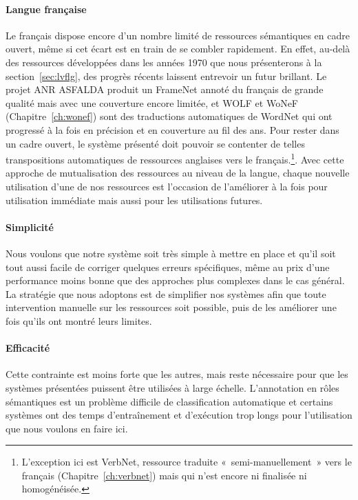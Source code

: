 \paragraph{Langue française} Le français dispose encore d'un nombre limité de
ressources sémantiques en cadre ouvert, même si cet écart est en train de se
combler rapidement. En effet, au-delà des ressources développées dans les
années 1970 que nous présenterons à la section~\ref{sec:lvflg}, des progrès
récents laissent entrevoir un futur brillant. Le projet ANR ASFALDA
\citep{candito2014developing} produit un FrameNet annoté du français de grande
qualité mais avec une couverture encore limitée, et WOLF
\citep{sagot2008building} et WoNeF (Chapitre~\ref{ch:wonef})  sont des
traductions automatiques de WordNet \citep{fellbaum1998wordnet} qui ont
progressé à la fois en précision et en couverture au fil des ans. Pour rester
dans un cadre ouvert, le système présenté doit pouvoir se contenter de telles
transpositions automatiques de ressources anglaises vers le
français.\footnote{L'exception ici est VerbNet, ressource traduite
«~semi-manuellement~» vers le français (Chapitre~\ref{ch:verbnet}) mais qui
n'est encore ni finalisée ni homogénéisée.}. Avec cette approche de
mutualisation des ressources au niveau de la langue, chaque nouvelle
utilisation d'une de nos ressources est l'occasion de l'améliorer à la fois
pour utilisation immédiate mais aussi pour les utilisations futures.

\paragraph{Simplicité} Nous voulons que notre système soit très simple à mettre
en place et qu'il soit tout aussi facile de corriger quelques erreurs
spécifiques, même au prix d'une performance moins bonne que des approches plus
complexes dans le cas général. La stratégie que nous adoptons est de simplifier
nos systèmes afin que toute intervention manuelle sur les ressources soit
possible, puis de les améliorer une fois qu'ils ont montré leurs limites.

\paragraph{Efficacité} Cette contrainte est moins forte que les autres, mais
reste nécessaire pour que les systèmes présentées puissent être utilisées à
large échelle. L'annotation en rôles sémantiques est un problème difficile de
classification automatique et certains systèmes ont des temps d'entraînement et
d'exécution trop longs pour l'utilisation que nous voulons en faire ici.

